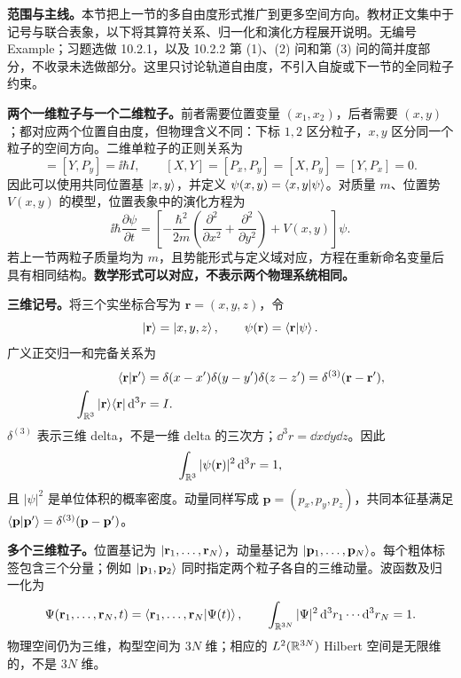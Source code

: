 \textbf{范围与主线。}本节把上一节的多自由度形式推广到更多空间方向。教材正文集中于记号与联合表象，以下将其算符关系、归一化和演化方程展开说明。无编号 Example；习题选做 10.2.1，以及 10.2.2 第 (1)、(2) 问和第 (3) 问的简并度部分，不收录未选做部分。这里只讨论轨道自由度，不引入自旋或下一节的全同粒子约束。

\textbf{两个一维粒子与一个二维粒子。}前者需要位置变量 $(x_1,x_2)$，后者需要 $(x,y)$；都对应两个位置自由度，但物理含义不同：下标 $1,2$ 区分粒子，$x,y$ 区分同一个粒子的空间方向。二维单粒子的正则关系为
\begin{equation}
  [X,P_x]=[Y,P_y]=\ii\hbar I,\qquad
  [X,Y]=[P_x,P_y]=[X,P_y]=[Y,P_x]=0.
\end{equation}
因此可以使用共同位置基 $\left|x,y\right\rangle$，并定义 $\psi(x,y)=\left\langle x,y \middle| \psi \right\rangle$。对质量 $m$、位置势 $V(x,y)$ 的模型，位置表象中的演化方程为
\begin{equation}
  \ii\hbar\frac{\partial\psi}{\partial t}
  =\left[-\frac{\hbar^2}{2m}
    \left(\frac{\partial^2}{\partial x^2}+\frac{\partial^2}{\partial y^2}\right)
    +V(x,y)\right]\psi.
\end{equation}
若上一节两粒子质量均为 $m$，且势能形式与定义域对应，方程在重新命名变量后具有相同结构。\textbf{数学形式可以对应，不表示两个物理系统相同。}

\textbf{三维记号。}将三个实坐标合写为 $\mathbf r=(x,y,z)$，令
\begin{equation}
  \left|\mathbf r\right\rangle=\left|x,y,z\right\rangle,\qquad
  \psi(\mathbf r)=\left\langle \mathbf r \middle| \psi \right\rangle.
\end{equation}
广义正交归一和完备关系为
\begin{align}
  \left\langle \mathbf r \middle| \mathbf r' \right\rangle
    &=\delta(x-x')\delta(y-y')\delta(z-z')
      =\delta^{(3)}(\mathbf r-\mathbf r'),\\
  \int_{\mathbb{R}^3}\left|\mathbf r\right\rangle\!\left\langle \mathbf r\right|\mathop{}\!\mathrm{d}^3r&=I.
\end{align}
$\delta^{(3)}$ 表示三维 delta，不是一维 delta 的三次方；$\dd^3r=\dd x\dd y\dd z$。因此
\begin{equation}
  \int_{\mathbb{R}^3}|\psi(\mathbf r)|^2\mathop{}\!\mathrm{d}^3r=1,
\end{equation}
且 $|\psi|^2$ 是单位体积的概率密度。动量同样写成 $\mathbf p=(p_x,p_y,p_z)$，共同本征基满足 $\left\langle \mathbf p \middle| \mathbf p' \right\rangle=\delta^{(3)}(\mathbf p-\mathbf p')$。

\textbf{多个三维粒子。}位置基记为 $\left|\mathbf r_1,\ldots,\mathbf r_N\right\rangle$，动量基记为 $\left|\mathbf p_1,\ldots,\mathbf p_N\right\rangle$。每个粗体标签包含三个分量；例如 $\left|\mathbf p_1,\mathbf p_2\right\rangle$ 同时指定两个粒子各自的三维动量。波函数及归一化为
\begin{equation}
  \Psi(\mathbf r_1,\ldots,\mathbf r_N,t)
    =\left\langle \mathbf r_1,\ldots,\mathbf r_N \middle| \Psi(t) \right\rangle,\qquad
  \int_{\mathbb{R}^{3N}}|\Psi|^2\mathop{}\!\mathrm{d}^3r_1\cdots\mathop{}\!\mathrm{d}^3r_N=1.
\end{equation}
物理空间仍为三维，构型空间为 $3N$ 维；相应的 $L^2(\mathbb{R}^{3N})$ Hilbert 空间是无限维的，不是 $3N$ 维。

